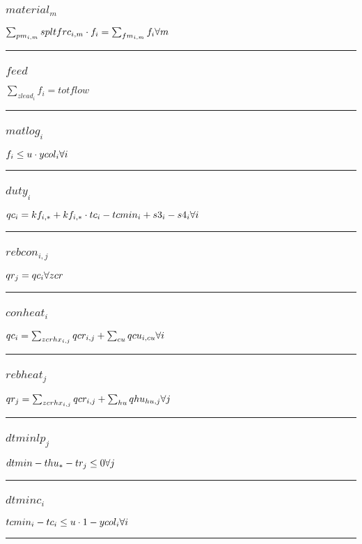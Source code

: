 \documentclass[11pt]{article}
\begin{document}
\subsubsection*{$material_{m}$}
$
\sum_{pm_{i,m}} spltfrc_{i,m} \cdot f_{i} = \sum_{fm_{i,m}} f_{i}\hfill \forall m
$
\vspace{5pt}
\hrule
\subsubsection*{$feed$}
$
\sum_{zlead_{i}} f_{i} = totflow
$
\vspace{5pt}
\hrule
\subsubsection*{$matlog_{i}$}
$
f_{i} \leq u \cdot ycol_{i}\hfill \forall i
$
\vspace{5pt}
\hrule
\subsubsection*{$duty_{i}$}
$
qc_{i} = kf_{i,*} + kf_{i,*} \cdot tc_{i} - tcmin_{i} + s3_{i} - s4_{i}\hfill \forall i
$
\vspace{5pt}
\hrule
\subsubsection*{$rebcon_{i,j}$}
$
qr_{j} = qc_{i}\hfill \forall zcr
$
\vspace{5pt}
\hrule
\subsubsection*{$conheat_{i}$}
$
qc_{i} = \sum_{zcrhx_{i,j}} qcr_{i,j} + \sum_{cu} qcu_{i,cu}\hfill \forall i
$
\vspace{5pt}
\hrule
\subsubsection*{$rebheat_{j}$}
$
qr_{j} = \sum_{zcrhx_{i,j}} qcr_{i,j} + \sum_{hu} qhu_{hu,j}\hfill \forall j
$
\vspace{5pt}
\hrule
\subsubsection*{$dtminlp_{j}$}
$
dtmin - thu_{*} - tr_{j} \leq 0\hfill \forall j
$
\vspace{5pt}
\hrule
\subsubsection*{$dtminc_{i}$}
$
tcmin_{i} - tc_{i} \leq u \cdot 1 - ycol_{i}\hfill \forall i
$
\vspace{5pt}
\hrule
\end{document}
